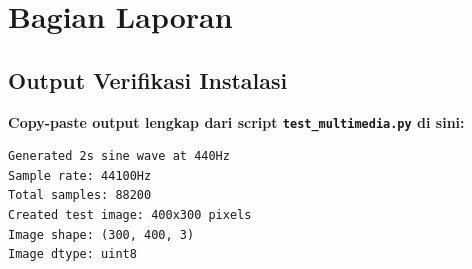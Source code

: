 \documentclass[11pt,a4paper]{article}
\begin{document}
\section{Bagian Laporan}

\subsection{Output Verifikasi Instalasi}
\textbf{Copy-paste output lengkap dari script \texttt{test\_multimedia.py} di sini:}

\begin{lstlisting}[caption=Output verifikasi instalasi]
Generated 2s sine wave at 440Hz
Sample rate: 44100Hz
Total samples: 88200
Created test image: 400x300 pixels
Image shape: (300, 400, 3)
Image dtype: uint8
\end{lstlisting}
\end{document}
